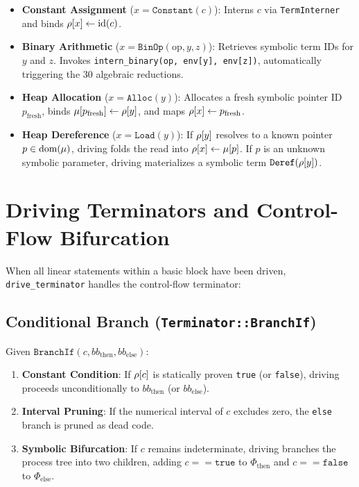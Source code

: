 \begin{itemize}
    \item \textbf{Constant Assignment} ($x = \mathtt{Constant}(c)$): Interns $c$ via \texttt{TermInterner} and binds $\rho[x] \gets \text{id}(c)$.
    \item \textbf{Binary Arithmetic} ($x = \mathtt{BinOp}(\text{op}, y, z)$): Retrieves symbolic term IDs for $y$ and $z$. Invokes \texttt{intern\_binary(op, env[y], env[z])}, automatically triggering the 30 algebraic reductions.
    \item \textbf{Heap Allocation} ($x = \mathtt{Alloc}(y)$): Allocates a fresh symbolic pointer ID $p_{\text{fresh}}$, binds $\mu[p_{\text{fresh}}] \gets \rho[y]$, and maps $\rho[x] \gets p_{\text{fresh}}$.
    \item \textbf{Heap Dereference} ($x = \mathtt{Load}(y)$): If $\rho[y]$ resolves to a known pointer $p \in \text{dom}(\mu)$, driving folds the read into $\rho[x] \gets \mu[p]$. If $p$ is an unknown symbolic parameter, driving materializes a symbolic term $\mathtt{Deref}(\rho[y])$.
\end{itemize}

\section{Driving Terminators and Control-Flow Bifurcation}
\label{sec:driving:terminators}

When all linear statements within a basic block have been driven, \texttt{drive\_terminator} handles the control-flow terminator:

\subsection{Conditional Branch (\texttt{Terminator::BranchIf})}
Given $\mathtt{BranchIf}(c, bb_{\text{then}}, bb_{\text{else}})$:
\begin{enumerate}
    \item \textbf{Constant Condition}: If $\rho[c]$ is statically proven \texttt{true} (or \texttt{false}), driving proceeds unconditionally to $bb_{\text{then}}$ (or $bb_{\text{else}}$).
    \item \textbf{Interval Pruning}: If the numerical interval of $c$ excludes zero, the \texttt{else} branch is pruned as dead code.
    \item \textbf{Symbolic Bifurcation}: If $c$ remains indeterminate, driving branches the process tree into two children, adding $c == \mathtt{true}$ to $\Phi_{\text{then}}$ and $c == \mathtt{false}$ to $\Phi_{\text{else}}$.
\end{enumerate}

